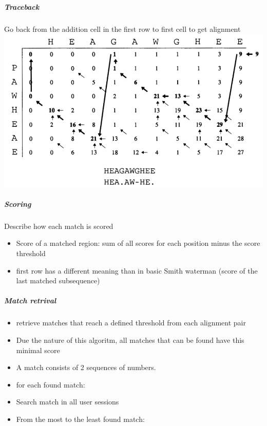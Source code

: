 \subparagraph{Traceback}
Go back from the addition cell in the first row to first cell to get alignment
\includegraphics[width=\textwidth]{chapters/approach/smithwatermanrepeated.png}
\subparagraph{Scoring}
Describe how each match is scored
\begin{itemize}
	\item Score of a matched region: sum of all scores for each position minus the score threshold 
	\item first row has a different meaning than in basic Smith waterman (score of the last matched subsequence)
\end{itemize}

\subparagraph{Match retrival}
	\begin{itemize}
		
		\item retrieve matches that reach a defined threshold from each alignment pair
		\item Due the nature of this algoritm, all matches that can be found have this minimal score
		\item A match consists of 2 sequences of numbers. 
		\item for each found match:
		\item Search match in all user sessions
		\item From the most to the least found match:
	\end{itemize}
